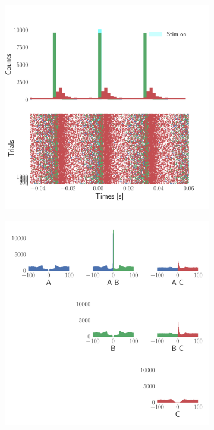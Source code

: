 \documentclass[11pt]{article}
\begin{document}
\begin{figure}
\medskip
\begin{subfigure}{0.485\textwidth} \includegraphics[scale=.25]{raster}
\caption{} \label{fig:intro:3}
\end{subfigure}\hfill
\begin{subfigure}{0.485\textwidth} \includegraphics[scale=.25]{xcorr}

\end{subfigure}
\end{figure}
\end{document}
